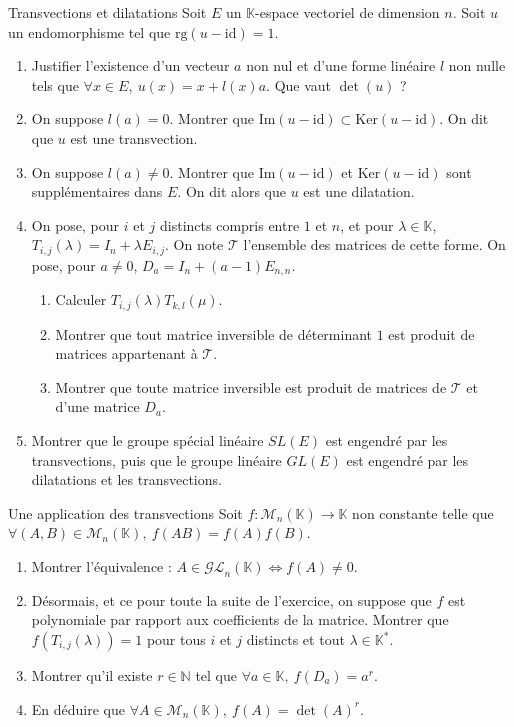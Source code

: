 \documentclass[french,a4paper]{article}
\newcommand{\N}{\mathbb{N}}
\newcommand{\K}{\mathbb{K}}
\newcommand{\st}{^*}
\renewcommand{\ker}{\text{Ker}}
\newcommand{\im}{\text{Im}}
\theoremstyle{plain}
\theoremstyle{definition}
\theoremstyle{remark}
\begin{document}
\begin{ex}[Châteaux]{Transvections et dilatations}
	Soit $E$ un $\K$-espace vectoriel de dimension $n$. Soit $u$ un endomorphisme tel que $\text{rg}(u-\text{id})=1$.
	\begin{enumerate}
		\item Justifier l'existence d'un vecteur $a$ non nul et d'une forme linéaire $l$ non nulle tels que $\forall x\in E,\ u(x)=x+l(x)a$. Que vaut $\det(u)$ ?
		\item On suppose $l(a)=0$. Montrer que $\im(u-\text{id})\subset\ker(u-\text{id})$. On dit que $u$ est une transvection.
		\item On suppose $l(a)\ne 0$. Montrer que $\im(u-\text{id})$ et $\ker(u-\text{id})$ sont supplémentaires dans $E$. On dit alors que $u$ est une dilatation.
		\item On pose, pour $i$ et $j$ distincts compris entre $1$ et $n$, et pour $\lambda\in\K$, $T_{i,j}(\lambda)=I_n+\lambda E_{i,j}$. On note $\mathcal{T}$ l'ensemble des matrices de cette forme. On pose, pour $a\ne 0$, $D_a=I_n+(a-1)E_{n,n}$.
		\begin{enumerate}[label=\alph*.]
			\item Calculer $T_{i,j}(\lambda)T_{k,l}(\mu)$.
			\item Montrer que tout matrice inversible de déterminant $1$ est produit de matrices appartenant à $\mathcal{T}$.
			\item Montrer que toute matrice inversible est produit de matrices de $\mathcal{T}$ et d'une matrice $D_a$.
		\end{enumerate}
		\item Montrer que le groupe spécial linéaire $SL(E)$ est engendré par les transvections, puis que le groupe linéaire $GL(E)$ est engendré par les dilatations et les transvections.
	\end{enumerate}
\end{ex}
\begin{ex}[Châteaux]{Une application des transvections}
	Soit $f:\mathcal{M}_n(\K)\to\K$ non constante telle que $\forall(A,B)\in\mathcal{M}_n(\K),\ f(AB)=f(A)f(B)$.
	\begin{enumerate}
		\item Montrer l'équivalence : $A\in\mathcal{GL}_n(\K)\iff f(A)\ne 0$.
		\item Désormais, et ce pour toute la suite de l'exercice, on suppose que $f$ est polynomiale par rapport aux coefficients de la matrice. Montrer que $f(T_{i,j}(\lambda))=1$ pour tous $i$ et $j$ distincts et tout $\lambda\in\K\st$.
		\item Montrer qu'il existe $r\in\N$ tel que $\forall a\in\K,\ f(D_a)=a^r$.
		\item En déduire que $\forall A\in\mathcal{M}_n(\K),\ f(A)=\det(A)^r$.
	\end{enumerate}
\end{ex}
\end{document}
